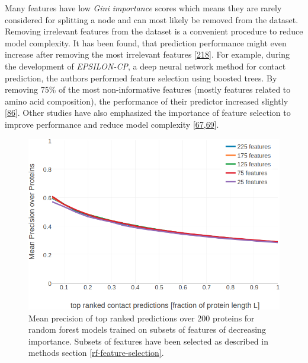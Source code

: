 \documentclass[11pt,a4paper,twoside]{book}
\theoremstyle{definition}
\theoremstyle{definition}
\theoremstyle{remark}
\begin{document}
Many features have low \emph{Gini importance} scores which means they
are rarely considered for splitting a node and can most likely be
removed from the dataset. Removing irrelevant features from the dataset
is a convenient procedure to reduce model complexity. It has been found,
that prediction performance might even increase after removing the most
irrelevant features {[}\protect\hyperlink{ref-Menze2009}{218}{]}. For
example, during the development of \emph{EPSILON-CP}, a deep neural
network method for contact prediction, the authors performed feature
selection using boosted trees. By removing 75\% of the most
non-informative features (mostly features related to amino acid
composition), the performance of their predictor increased slightly
{[}\protect\hyperlink{ref-Stahl2017}{86}{]}. Other studies have also
emphasized the importance of feature selection to improve performance
and reduce model complexity
{[}\protect\hyperlink{ref-Cheng2007}{67},\protect\hyperlink{ref-Li2011}{69}{]}.







\begin{figure}
\includegraphics[width=0.9\linewidth]{img/random_forest_contact_prior/precision_vs_rank_featureselection_random_forest_optimized_hyperparameters} \caption{Mean precision of top
ranked predictions over 200 proteins for random forest models trained on
subsets of features of decreasing importance. Subsets of features have
been selected as described in methods section
\ref{rf-feature-selection}.}\label{fig:rf-feature-selection-performance}
\end{figure}
\end{document}
